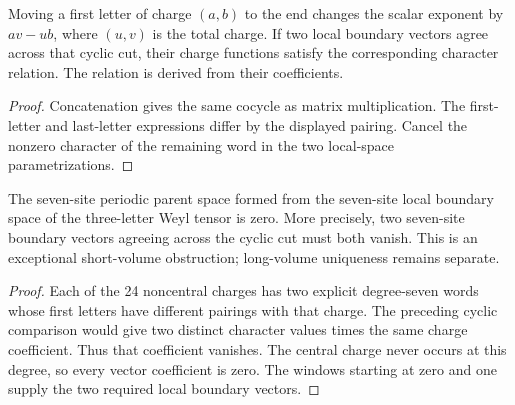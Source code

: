 \begin{lemma}
    \label{lem:short_volume_weyl_cyclic_phase}
    \leanok
    Moving a first letter of charge $(a,b)$ to the end changes the
    scalar exponent by $av-ub$, where $(u,v)$ is the total charge.
    If two local boundary vectors agree across that cyclic cut,
    their charge functions satisfy the corresponding character relation.
    The relation is derived from their coefficients.
\end{lemma}
\begin{proof}\leanok
    Concatenation gives the same cocycle as matrix multiplication.
    The first-letter and last-letter expressions differ by the displayed
    pairing. Cancel the nonzero character of the remaining word in the
    two local-space parametrizations.
\end{proof}

\begin{lemma}
    \label{lem:short_volume_weyl_seven_periodic_zero}
    \leanok
    The seven-site periodic parent space formed from the
    seven-site local boundary space of the three-letter Weyl tensor
    is zero. More precisely, two seven-site boundary vectors agreeing
    across the cyclic cut must both vanish. This is an exceptional
    short-volume obstruction; long-volume uniqueness remains separate.
\end{lemma}
\begin{proof}\leanok
    Each of the 24 noncentral charges has two explicit degree-seven words
    whose first letters have different pairings with that charge.
    The preceding cyclic comparison would give two distinct character
    values times the same charge coefficient. Thus that coefficient
    vanishes. The central charge never occurs at this degree, so every
    vector coefficient is zero. The windows starting at zero
    and one supply the two required local boundary vectors.
\end{proof}

